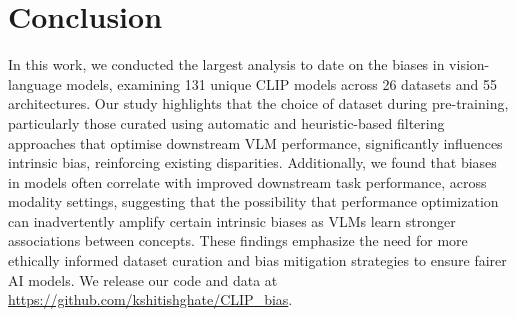 \section{Conclusion}

In this work, we conducted the largest analysis to date on the biases in vision-language models, examining 131 unique CLIP models across 26 datasets and 55 architectures. Our study highlights that the choice of dataset during pre-training, particularly those curated using automatic and heuristic-based filtering approaches that optimise downstream VLM performance, significantly influences intrinsic bias, reinforcing existing disparities. Additionally, we found that biases in models often correlate with improved downstream task performance, across modality settings, suggesting that the possibility that performance optimization can inadvertently amplify certain intrinsic biases as VLMs learn stronger associations between concepts. These findings emphasize the need for more ethically informed dataset curation and bias mitigation strategies to ensure fairer AI models. We release
our code and data at \url{https://github.com/kshitishghate/CLIP_bias}. 